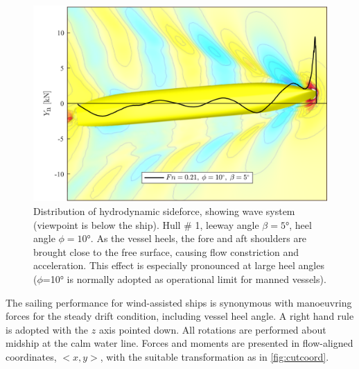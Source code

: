 \documentclass[twoside,twocolumn]{article}
\begin{document}
\begin{figure}[!h]
	\centering
	\includegraphics[width=.7\textwidth]{images/hull1.png}  %
	\caption{Distribution of hydrodynamic sideforce, showing wave system (viewpoint is below the ship).  Hull \# 1, leeway angle $\beta=\ang{5}$, heel angle $\phi=\ang{10}$. As the vessel heels, the fore and aft shoulders are brought close to the free surface, causing flow constriction and acceleration. This effect is especially pronounced at large heel angles ($\phi$=\ang{10} is normally adopted as operational limit for manned vessels).}
	\label{fig:Ynphi}
\end{figure}


The sailing performance for wind-assisted ships is synonymous with manoeuvring forces for the steady drift condition, including vessel heel angle. A right hand rule is adopted with the $z$ axis pointed down. All rotations are performed about midship at the calm water line. Forces and moments are presented in flow-aligned coordinates, $<x,y>$, with the suitable transformation as in \cref{fig:cutcoord}.
\end{document}
